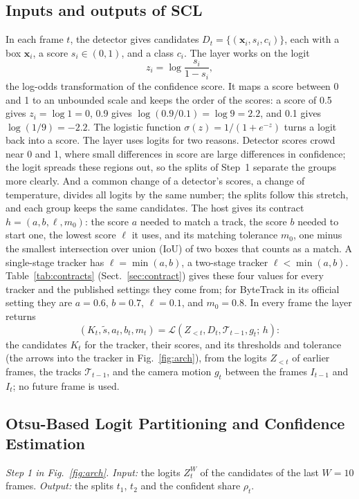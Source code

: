 \subsection{Inputs and outputs of SCL}\label{sec:problem}
In each frame $t$, the detector gives candidates $D_t=\{(\mathbf{x}_i,s_i,c_i)\}$, each with a box
$\mathbf{x}_i$, a score $s_i\in(0,1)$, and a class $c_i$. The layer works on the logit
\begin{equation}
z_i=\log\frac{s_i}{1-s_i},
\label{eq:logit}
\end{equation}
the log-odds transformation of the confidence score. It maps a score between 0 and 1 to an
unbounded scale and keeps the order of the scores: a score of 0.5 gives $z_i=\log1=0$, 0.9 gives
$\log(0.9/0.1)=\log9=2.2$, and 0.1 gives $\log(1/9)=-2.2$. The logistic function $\sigma(z)=1/(1+e^{-z})$ turns a logit back into a
score. The layer uses logits for two reasons. Detector scores crowd near 0 and 1, where small
differences in score are large differences in confidence; the logit spreads these regions out, so
the splits of Step~1 separate the groups more clearly. And a common change of a detector's scores,
a change of temperature, divides all logits by the same number; the splits follow this stretch,
and each group keeps the same candidates. The host gives its contract $h=(a,b,\ell,m_0)$: the score $a$ needed to match a track, the
score $b$ needed to start one, the lowest score $\ell$ it uses, and its matching tolerance $m_0$,
one minus the smallest intersection over union (IoU) of two boxes that counts as a match. A
single-stage tracker has $\ell=\min(a,b)$, a two-stage tracker $\ell<\min(a,b)$. Table~\ref{tab:contracts}
(Sect.~\ref{sec:contract}) gives these four values for every tracker and the published settings they
come from; for ByteTrack in its official setting they are $a=0.6$, $b=0.7$, $\ell=0.1$, and
$m_0=0.8$. In every frame
the layer returns
\begin{equation}
\left(K_t,\tilde{s},a_t,b_t,m_t\right)=
\mathcal{L}\left(Z_{<t},D_t,\mathcal{T}_{t-1},g_t;\,h\right):
\label{eq:layer}
\end{equation}
the candidates $K_t$ for the tracker, their scores, and its thresholds and tolerance (the arrows
into the tracker in Fig.~\ref{fig:arch}), from the logits $Z_{<t}$ of earlier frames, the tracks
$\mathcal{T}_{t-1}$, and the camera motion $g_t$ between the frames $I_{t-1}$ and $I_t$; no future
frame is used.



\subsection{Otsu-Based Logit Partitioning and Confidence Estimation}\label{sec:calib}
\emph{Step 1 in Fig.~\ref{fig:arch}. Input:} the logits $Z_t^W$ of the candidates of the last $W=10$ frames. \emph{Output:} the
splits $t_1$, $t_2$ and the confident share $\rho_t$.

